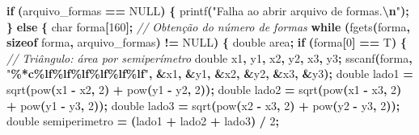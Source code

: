 \documentclass[
  11pt,
  a4paper,
]{scrbook}
\newenvironment{Shaded}{\begin{snugshade}}{\end{snugshade}}
\newcommand{\CharTok}[1]{\textcolor[rgb]{0.31,0.60,0.02}{#1}}
\newcommand{\CommentTok}[1]{\textcolor[rgb]{0.56,0.35,0.01}{\textit{#1}}}
\newcommand{\ControlFlowTok}[1]{\textcolor[rgb]{0.13,0.29,0.53}{\textbf{#1}}}
\newcommand{\DataTypeTok}[1]{\textcolor[rgb]{0.13,0.29,0.53}{#1}}
\newcommand{\DecValTok}[1]{\textcolor[rgb]{0.00,0.00,0.81}{#1}}
\newcommand{\KeywordTok}[1]{\textcolor[rgb]{0.13,0.29,0.53}{\textbf{#1}}}
\newcommand{\NormalTok}[1]{#1}
\newcommand{\OperatorTok}[1]{\textcolor[rgb]{0.81,0.36,0.00}{\textbf{#1}}}
\newcommand{\SpecialCharTok}[1]{\textcolor[rgb]{0.81,0.36,0.00}{\textbf{#1}}}
\newcommand{\StringTok}[1]{\textcolor[rgb]{0.31,0.60,0.02}{#1}}
\begin{document}
\begin{Shaded}
\begin{Highlighting}[]
    \ControlFlowTok{if} \OperatorTok{(}\NormalTok{arquivo\_formas }\OperatorTok{==}\NormalTok{ NULL}\OperatorTok{)} \OperatorTok{\{}
\NormalTok{        printf}\OperatorTok{(}\StringTok{"Falha ao abrir arquivo de formas.}\SpecialCharTok{\textbackslash{}n}\StringTok{"}\OperatorTok{);}
    \OperatorTok{\}}
    \ControlFlowTok{else} \OperatorTok{\{}
        \DataTypeTok{char}\NormalTok{ forma}\OperatorTok{[}\DecValTok{160}\OperatorTok{];}
        \CommentTok{// Obtenção do número de formas}
        \ControlFlowTok{while} \OperatorTok{(}\NormalTok{fgets}\OperatorTok{(}\NormalTok{forma}\OperatorTok{,} \KeywordTok{sizeof}\NormalTok{ forma}\OperatorTok{,}\NormalTok{ arquivo\_formas}\OperatorTok{)} \OperatorTok{!=}\NormalTok{ NULL}\OperatorTok{)} \OperatorTok{\{}
            \DataTypeTok{double}\NormalTok{ area}\OperatorTok{;}
            \ControlFlowTok{if} \OperatorTok{(}\NormalTok{forma}\OperatorTok{[}\DecValTok{0}\OperatorTok{]} \OperatorTok{==} \CharTok{\textquotesingle{}T\textquotesingle{}}\OperatorTok{)} \OperatorTok{\{}
                \CommentTok{// Triângulo: área por semiperímetro}
                \DataTypeTok{double}\NormalTok{ x1}\OperatorTok{,}\NormalTok{ y1}\OperatorTok{,}\NormalTok{ x2}\OperatorTok{,}\NormalTok{ y2}\OperatorTok{,}\NormalTok{ x3}\OperatorTok{,}\NormalTok{ y3}\OperatorTok{;}
\NormalTok{                sscanf}\OperatorTok{(}\NormalTok{forma}\OperatorTok{,} \StringTok{"}\SpecialCharTok{\%*c\%lf\%lf\%lf\%lf\%lf\%lf}\StringTok{"}\OperatorTok{,}
                       \OperatorTok{\&}\NormalTok{x1}\OperatorTok{,} \OperatorTok{\&}\NormalTok{y1}\OperatorTok{,} \OperatorTok{\&}\NormalTok{x2}\OperatorTok{,} \OperatorTok{\&}\NormalTok{y2}\OperatorTok{,} \OperatorTok{\&}\NormalTok{x3}\OperatorTok{,} \OperatorTok{\&}\NormalTok{y3}\OperatorTok{);}
                \DataTypeTok{double}\NormalTok{ lado1 }\OperatorTok{=}\NormalTok{ sqrt}\OperatorTok{(}\NormalTok{pow}\OperatorTok{(}\NormalTok{x1 }\OperatorTok{{-}}\NormalTok{ x2}\OperatorTok{,} \DecValTok{2}\OperatorTok{)} \OperatorTok{+}\NormalTok{ pow}\OperatorTok{(}\NormalTok{y1 }\OperatorTok{{-}}\NormalTok{ y2}\OperatorTok{,} \DecValTok{2}\OperatorTok{));}
                \DataTypeTok{double}\NormalTok{ lado2 }\OperatorTok{=}\NormalTok{ sqrt}\OperatorTok{(}\NormalTok{pow}\OperatorTok{(}\NormalTok{x1 }\OperatorTok{{-}}\NormalTok{ x3}\OperatorTok{,} \DecValTok{2}\OperatorTok{)} \OperatorTok{+}\NormalTok{ pow}\OperatorTok{(}\NormalTok{y1 }\OperatorTok{{-}}\NormalTok{ y3}\OperatorTok{,} \DecValTok{2}\OperatorTok{));}
                \DataTypeTok{double}\NormalTok{ lado3 }\OperatorTok{=}\NormalTok{ sqrt}\OperatorTok{(}\NormalTok{pow}\OperatorTok{(}\NormalTok{x2 }\OperatorTok{{-}}\NormalTok{ x3}\OperatorTok{,} \DecValTok{2}\OperatorTok{)} \OperatorTok{+}\NormalTok{ pow}\OperatorTok{(}\NormalTok{y2 }\OperatorTok{{-}}\NormalTok{ y3}\OperatorTok{,} \DecValTok{2}\OperatorTok{));}
                \DataTypeTok{double}\NormalTok{ semiperimetro }\OperatorTok{=} \OperatorTok{(}\NormalTok{lado1 }\OperatorTok{+}\NormalTok{ lado2 }\OperatorTok{+}\NormalTok{ lado3}\OperatorTok{)} \OperatorTok{/} \DecValTok{2}\OperatorTok{;}


\end{Highlighting}
\end{Shaded}
\end{document}
